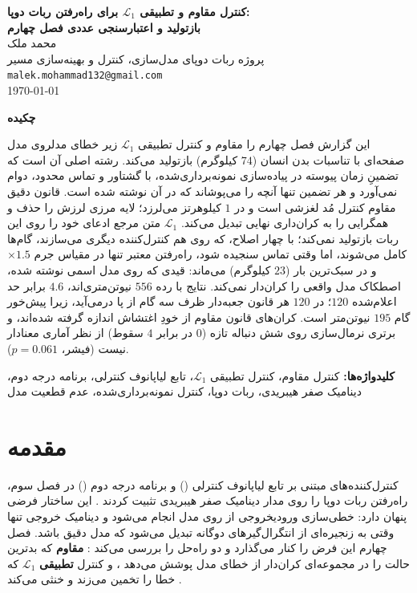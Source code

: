 \documentclass[10pt,twocolumn]{article}
\makeatletter
\newcommand{\en}[1]{\lr{#1}}
\newcommand{\md}{\lr{\textemdash}}
\newcommand{\nd}{\lr{\textendash}}
\newcommand{\reporttitle}{کنترل مقاوم و تطبیقی $\mathcal{L}_1$ برای راه‌رفتن ربات دوپا:\\[0.2em]
بازتولید و اعتبارسنجی عددی فصل چهارم}
\newcommand{\reportauthor}{محمد ملک}
\newcommand{\reportaffil}{پروژه ربات دوپای \en{RABBIT} \nd{} مدل‌سازی، کنترل و بهینه‌سازی مسیر}
\newcommand{\reportemail}{malek.mohammad132@gmail.com}
\makeatother
\begin{document}
\onecolumn
\begin{center}
    {\bfseries\Large \reporttitle}\\[0.8em]
    \reportauthor \\
    \small \reportaffil \\
    \small \texttt{\reportemail} \\[0.3em]
    \today
\end{center}
\vspace{1em}

\begin{center}
    {\bfseries\large چکیده}
\end{center}
\noindent
این گزارش فصل چهارم را\md{}\en{CLF-QP} مقاوم و کنترل تطبیقی $\mathcal{L}_1$ زیر خطای
مدل\md{}روی مدل صفحه‌ای \en{RABBIT} با تناسبات بدن انسان ($74$ کیلوگرم)
بازتولید می‌کند. رشته اصلی آن است که تضمینِ زمان پیوسته در پیاده‌سازی نمونه‌برداری‌شده، با
گشتاور و تماس محدود، دوام نمی‌آورد و هر تضمین تنها آنچه را می‌پوشاند که در آن نوشته شده است.
قانون دقیق مقاوم کنترل مُد لغزشی است و در $1$ کیلوهرتز می‌لرزد؛ لایه مرزی لرزش را حذف و
همگرایی را به کران‌داری نهایی تبدیل می‌کند. $\mathcal{L}_1$ متن مرجع ادعای خود را روی این
ربات بازتولید نمی‌کند؛ با چهار اصلاح، که روی هم کنترل‌کننده دیگری می‌سازند، گام‌ها کامل
می‌شوند، اما وقتی تماس سنجیده شود، راه‌رفتن معتبر تنها در مقیاس جرم $\times1.5$ و در سبک‌ترین
بار ($23$ کیلوگرم) می‌ماند: قیدی که روی مدل اسمی نوشته شده، اصطکاک مدل واقعی را کران‌دار
نمی‌کند. نتایج با رده $556$ نیوتن‌متری‌اند، $4.6$ برابر حد اعلام‌شده $120$؛ در $120$
هر قانون جعبه‌دار ظرف سه گام از پا درمی‌آید، زیرا پیش‌خور گام $195$ نیوتن‌متر است.
کران‌های قانون مقاوم از خودِ اغتشاش اندازه گرفته شده‌اند، و برتری نرمال‌سازی روی شش دنباله
تازه ($0$ در برابر $4$ سقوط) از نظر آماری معنادار نیست (فیشر، $p=0.061$).

\vspace{0.6em}
\noindent\textbf{کلیدواژه‌ها:} کنترل مقاوم، کنترل تطبیقی $\mathcal{L}_1$، تابع
لیاپانوف کنترلی، برنامه درجه دوم، دینامیک صفر هیبریدی، ربات دوپا، کنترل
نمونه‌برداری‌شده، عدم قطعیت مدل
\vspace{1em}
\twocolumn

\section{مقدمه}
کنترل‌کننده‌های مبتنی بر تابع لیاپانوف کنترلی (\en{CLF}) و برنامه درجه دوم
(\en{QP}) در فصل سوم، راه‌رفتن ربات دوپا را روی مدار دینامیک صفر هیبریدی تثبیت
کردند \cite{ames2014resclf,westervelt2007feedback}. این ساختار فرضی پنهان دارد:
خطی‌سازی ورودی\nd{}خروجی از روی مدل انجام می‌شود و دینامیک خروجی تنها وقتی به
زنجیره‌ای از انتگرال‌گیرهای دوگانه تبدیل می‌شود که مدل دقیق باشد. فصل چهارم این
فرض را کنار می‌گذارد و دو راه‌حل را بررسی می‌کند \cite{nguyen2017thesis}:
\en{CLF-QP} \textbf{مقاوم} که بدترین حالت را در مجموعه‌ای کران‌دار از خطای مدل
پوشش می‌دهد \cite{nguyen2015robust}، و کنترل \textbf{تطبیقی} $\mathcal{L}_1$ که
خطا را تخمین می‌زند و خنثی می‌کند \cite{nguyen2015l1,hovakimyan2010l1}.
\end{document}
